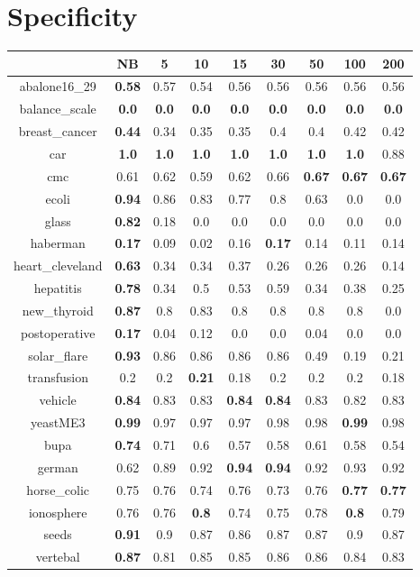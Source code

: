 \documentclass{article}%
\begin{document}
%
\section*{Specificity}%
\begin{tabular}{c|cccccccc}%
\hline%
&NB&5&10&15&30&50&100&200\\%
\hline%
abalone16\_29&\textbf{0.58}&0.57&0.54&0.56&0.56&0.56&0.56&0.56\\%
\hline%
balance\_scale&\textbf{0.0}&\textbf{0.0}&\textbf{0.0}&\textbf{0.0}&\textbf{0.0}&\textbf{0.0}&\textbf{0.0}&\textbf{0.0}\\%
\hline%
breast\_cancer&\textbf{0.44}&0.34&0.35&0.35&0.4&0.4&0.42&0.42\\%
\hline%
car&\textbf{1.0}&\textbf{1.0}&\textbf{1.0}&\textbf{1.0}&\textbf{1.0}&\textbf{1.0}&\textbf{1.0}&0.88\\%
\hline%
cmc&0.61&0.62&0.59&0.62&0.66&\textbf{0.67}&\textbf{0.67}&\textbf{0.67}\\%
\hline%
ecoli&\textbf{0.94}&0.86&0.83&0.77&0.8&0.63&0.0&0.0\\%
\hline%
glass&\textbf{0.82}&0.18&0.0&0.0&0.0&0.0&0.0&0.0\\%
\hline%
haberman&\textbf{0.17}&0.09&0.02&0.16&\textbf{0.17}&0.14&0.11&0.14\\%
\hline%
heart\_cleveland&\textbf{0.63}&0.34&0.34&0.37&0.26&0.26&0.26&0.14\\%
\hline%
hepatitis&\textbf{0.78}&0.34&0.5&0.53&0.59&0.34&0.38&0.25\\%
\hline%
new\_thyroid&\textbf{0.87}&0.8&0.83&0.8&0.8&0.8&0.8&0.0\\%
\hline%
postoperative&\textbf{0.17}&0.04&0.12&0.0&0.0&0.04&0.0&0.0\\%
\hline%
solar\_flare&\textbf{0.93}&0.86&0.86&0.86&0.86&0.49&0.19&0.21\\%
\hline%
transfusion&0.2&0.2&\textbf{0.21}&0.18&0.2&0.2&0.2&0.18\\%
\hline%
vehicle&\textbf{0.84}&0.83&0.83&\textbf{0.84}&\textbf{0.84}&0.83&0.82&0.83\\%
\hline%
yeastME3&\textbf{0.99}&0.97&0.97&0.97&0.98&0.98&\textbf{0.99}&0.98\\%
\hline%
bupa&\textbf{0.74}&0.71&0.6&0.57&0.58&0.61&0.58&0.54\\%
\hline%
german&0.62&0.89&0.92&\textbf{0.94}&\textbf{0.94}&0.92&0.93&0.92\\%
\hline%
horse\_colic&0.75&0.76&0.74&0.76&0.73&0.76&\textbf{0.77}&\textbf{0.77}\\%
\hline%
ionosphere&0.76&0.76&\textbf{0.8}&0.74&0.75&0.78&\textbf{0.8}&0.79\\%
\hline%
seeds&\textbf{0.91}&0.9&0.87&0.86&0.87&0.87&0.9&0.87\\%
\hline%
vertebal&\textbf{0.87}&0.81&0.85&0.85&0.86&0.86&0.84&0.83\\%
\hline%
\end{tabular}
\end{document}
